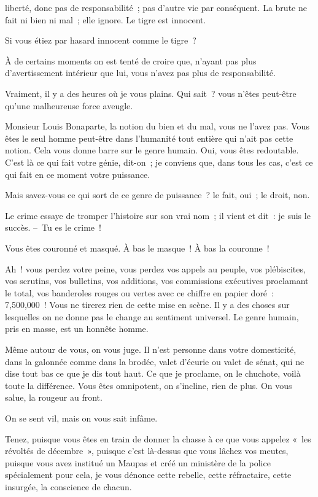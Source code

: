 \documentclass[french,twoside]{book} %
\begin{document}
liberté, donc pas de responsabilité ; pas d’autre vie par conséquent. La brute ne fait ni bien ni mal ; elle ignore. Le tigre est innocent.\par
Si vous étiez par hasard innocent comme le tigre ?\par
À de certains moments on est tenté de croire que, n’ayant pas plus d’avertissement intérieur que lui, vous n’avez pas plus de responsabilité.\par
Vraiment, il y a des heures où je vous plains. Qui sait ? vous n’êtes peut-être qu’une malheureuse force aveugle.\par
Monsieur Louis Bonaparte, la notion du bien et du mal, vous ne l’avez pas. Vous êtes le seul homme peut-être dans l’humanité tout entière qui n’ait pas cette notion. Cela vous donne barre sur le genre humain. Oui, vous êtes redoutable. C’est là ce qui fait votre génie, dit-on ; je conviens que, dans tous les cas, c’est ce qui fait en ce moment votre puissance.\par
Mais savez-vous ce qui sort de ce genre de puissance ? le fait, oui ; le droit, non.\par
Le crime essaye de tromper l’histoire sur son vrai nom ; il vient et dit : je suis le succès. – Tu es le crime !\par
Vous êtes couronné et masqué. À bas le masque ! À bas la couronne !\par
Ah ! vous perdez votre peine, vous perdez vos appels au peuple, vos plébiscites, vos scrutins, vos bulletins, vos additions, vos commissions exécutives proclamant le total, vos banderoles rouges ou vertes avec ce chiffre en papier doré : 7,500,000 ! Vous ne tirerez rien de cette mise en scène. Il y a des choses sur lesquelles on ne donne pas le change au sentiment universel. Le genre humain, pris en masse, est un honnête homme.\par
Même autour de vous, on vous juge. Il n’est personne dans votre domesticité, dans la galonnée comme dans la brodée, valet d’écurie ou valet de sénat, qui ne dise tout bas ce que je dis tout haut. Ce que je proclame, on le chuchote, voilà toute la différence. Vous êtes omnipotent, on s’incline, rien de plus. On vous salue, la rougeur au front.\par
On se sent vil, mais on vous sait infâme.\par
Tenez, puisque vous êtes en train de donner la chasse à ce que vous appelez « les révoltés de décembre », puisque c’est là-dessus que vous lâchez vos meutes, puisque vous avez institué un Maupas et créé un ministère de la police spécialement pour cela, je vous dénonce cette rebelle, cette réfractaire, cette insurgée, la conscience de chacun.\par
\end{document}
